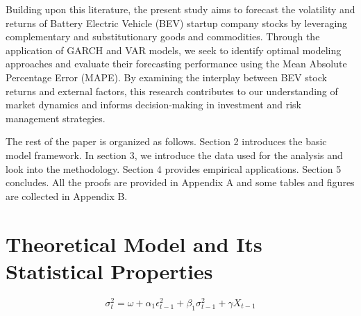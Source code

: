 \documentclass[a4paper,12pt]{article}
\begin{document}
Building upon this literature, the present study aims to forecast the volatility and returns of Battery Electric Vehicle (BEV) startup company stocks by leveraging complementary and substitutionary goods and commodities. Through the application of GARCH and VAR models, we seek to identify optimal modeling approaches and evaluate their forecasting performance using the Mean Absolute Percentage Error (MAPE). By examining the interplay between BEV stock returns and external factors, this research contributes to our understanding of market dynamics and informs decision-making in investment and risk management strategies.

The rest of the paper is organized as follows.
Section 2 introduces the basic model framework. In section 3, we introduce the data used for the analysis and look into the methodology. Section 4 provides
empirical applications. Section 5 concludes. All the proofs are
provided in Appendix A and some tables and figures are collected
in Appendix B.\\

\section{Theoretical Model and Its Statistical Properties}

\begin{equation}\label{eq:garch_model}
\sigma^2_t = \omega + \alpha_1\epsilon^2_{t-1} + \beta_1\sigma^2_{t-1} + \gamma X_{t-1}
\end{equation}
\end{document}
